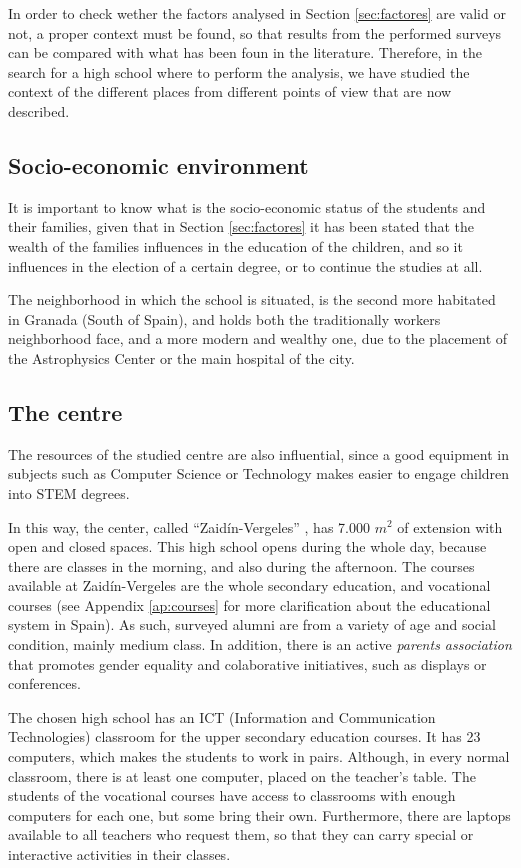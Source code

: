 \documentclass[journal,transmag]{IEEEtran}
\begin{document}
In order to check wether the factors analysed in Section \ref{sec:factores} are valid or not, a proper context must be found, so that results from the performed surveys can be compared with what has been foun in the literature. Therefore, in the search for a high school where to perform the analysis, we have studied the context of the different places from different points of view that are now described.

\subsection{Socio-economic environment}

It is important to know what is the socio-economic status of the students and their families, given that in Section \ref{sec:factores} it has been stated that the wealth of the families influences in the education of the children, and so it influences in the election of a certain degree, or to continue the studies at all.

The neighborhood in which the school is situated, is the second more habitated in Granada (South of Spain), and holds both the traditionally workers neighborhood face, and a more modern and wealthy one, due to the placement of the Astrophysics Center or the main hospital of the city.

\subsection{The centre}

The resources of the studied centre are also influential, since a good equipment in subjects such as Computer Science or Technology makes easier to engage children into STEM degrees.

In this way, the center, called ``Zaid\'{i}n-Vergeles'' \cite{iesZV:2013}, has 7.000 $m^2$ of extension with open and closed spaces. This high school opens during the whole day, because there are classes in the morning, and also during the afternoon. The courses available at Zaid\'{i}n-Vergeles are the whole secondary education, and vocational courses (see Appendix \ref{ap:courses} for more clarification about the educational system in Spain). As such, surveyed alumni are from a variety of age and social condition, mainly medium class. In addition, there is an active \textit{parents association} that promotes gender equality and colaborative initiatives, such as displays or conferences.

The chosen high school has an ICT (Information and Communication Technologies) classroom for the upper secondary education courses. It has 23 computers, which makes the students to work in pairs. Although, in every normal classroom, there is at least one computer, placed on the teacher's table. The students of the vocational courses have access to classrooms with enough computers for each one, but some bring their own. Furthermore, there are laptops available to all teachers who request them, so that they can carry special or interactive activities in their classes.
\end{document}
